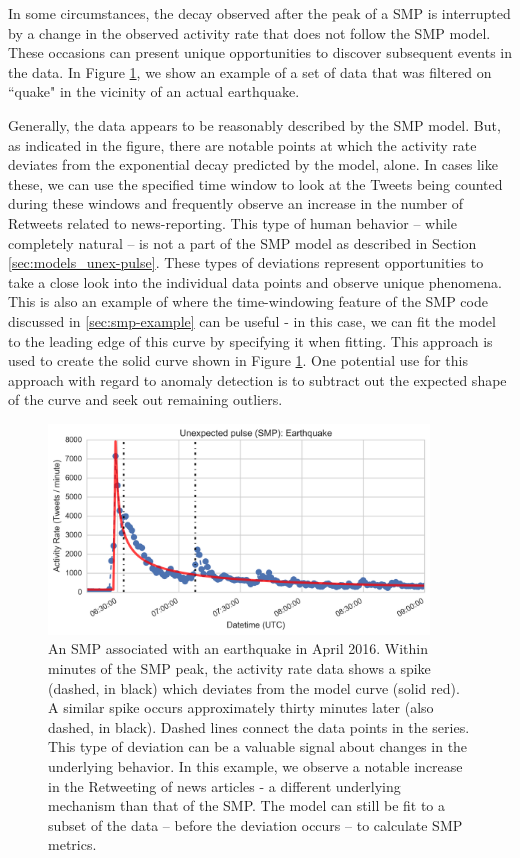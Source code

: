\documentclass{article}
\begin{document}
In some circumstances, the decay observed after the peak of a SMP is interrupted by a change in the observed activity rate that does not follow the SMP model. These occasions can present unique opportunities to discover subsequent events in the data. In Figure \ref{fig:smp-fit-deviation}, we show an example of a set of data that was filtered on ``quake" in the vicinity of an actual earthquake. 

Generally, the data appears to be reasonably described by the SMP model. But, as indicated in the figure, there are notable points at which the activity rate deviates from the exponential decay predicted by the model, alone. In cases like these, we can use the specified time window to look at the Tweets being counted during these windows and frequently observe an increase in the number of Retweets related to news-reporting. This type of human behavior -- while completely natural -- is not a part of the SMP model as described in Section \ref{sec:models_unex-pulse}. These types of deviations represent opportunities to take a close look into the individual data points and observe unique phenomena. This is also an example of where the time-windowing feature of the SMP code discussed in \ref{sec:smp-example} can be useful - in this case, we can fit the model to the leading edge of this curve by specifying it when fitting. This approach is used to create the solid curve shown in Figure \ref{fig:smp-fit-deviation}. One potential use for this approach with regard to anomaly detection is to subtract out the expected shape of the curve and seek out remaining outliers.  


\begin{figure}[!h]
\centering
\includegraphics[width=0.9\textwidth]{img/earthquake-deviation.png}
\caption{An SMP associated with an earthquake in April 2016. Within minutes of the SMP peak, the activity rate data shows a spike (dashed, in black) which deviates from the model curve (solid red). A similar spike occurs approximately thirty minutes later (also dashed, in black). Dashed lines connect the data points in the series. This type of deviation can be a valuable signal about changes in the underlying behavior. In this example, we observe a notable increase in the Retweeting of news articles - a different underlying mechanism than that of the SMP. The model can still be fit to a subset of the data -- before the deviation occurs -- to calculate SMP metrics.} 
\label{fig:smp-fit-deviation}
\end{figure}
\end{document}
